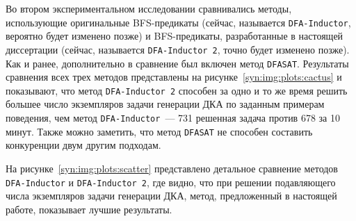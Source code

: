 \begin{table}[ht]
  \caption{Медианное время работы методов генерации ДКА по заданным примерам поведения с использованием BFS-предикатов нарушения симметрии, DFS-предикатов нарушения симметрии и метода \texttt{DFASAT} в секундах, посчитанное на 100 задачах для каждого набора параметров. Время работы методов было ограничено одним часом ($\text{TL} = 3600\,\, \text{секунд}$)}
  \centering
  \label{syn:tab:DFS-results}
\end{table}

Во втором экспериментальном исследовании сравнивались методы, использующие оригинальные BFS-предикаты (сейчас, называется \texttt{DFA-Inductor}, вероятно будет изменено позже) и BFS-предикаты, разработанные в настоящей диссертации (сейчас, называется \texttt{DFA-Inductor~2}, точно будет изменено позже).
Как и ранее, дополнительно в сравнение был включен метод \texttt{DFASAT}.
Результаты сравнения всех трех методов представлены на рисунке~\ref{syn:img:plots:cactus} и показывают, что метод \texttt{DFA-Inductor~2} способен за одно и то же время решить большее число экземпляров задачи генерации ДКА по заданным примерам поведения, чем метод \texttt{DFA-Inductor}~--- 731 решенная задача против 678 за 10 минут.
Также можно заметить, что метод \texttt{DFASAT} не способен составить конкуренции двум другим подходам.

На рисунке~\ref{syn:img:plots:scatter} представлено детальное сравнение методов \texttt{DFA-Inductor} и \texttt{DFA-Inductor~2}, где видно, что при решении подавляющего числа экземпляров задачи генерации ДКА, метод, предложенный в настоящей работе, показывает лучшие результаты.

